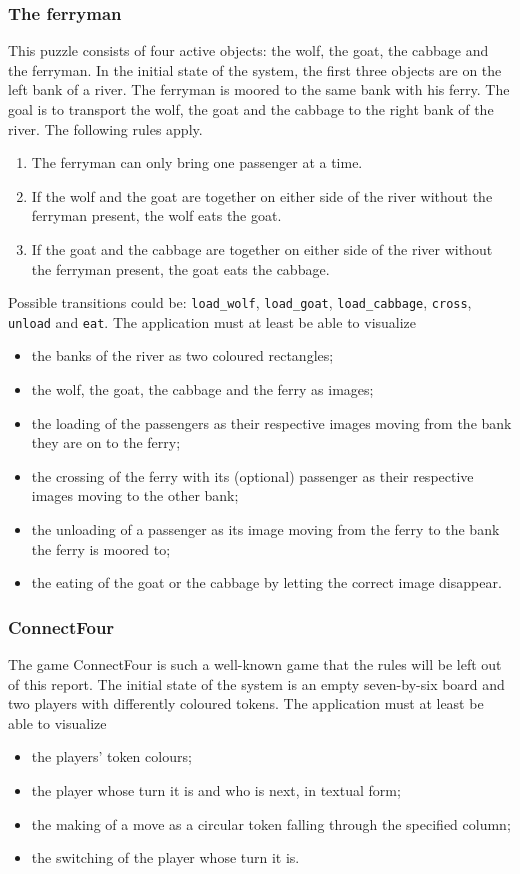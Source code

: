 \documentclass[a4paper]{article}
\begin{document}
\subsubsection{The ferryman}
This puzzle consists of four active objects: the wolf, the goat, the cabbage and the ferryman. In the initial state of the system, the first three objects are on the left bank of a river. The ferryman is moored to the same bank with his ferry. The goal is to transport the wolf, the goat and the cabbage to the right bank of the river. The following rules apply.
  \begin{enumerate}
  \item The ferryman can only bring one passenger at a time.
  \item If the wolf and the goat are together on either side of the river without the ferryman present, the wolf eats the goat.
  \item If the goat and the cabbage are together on either side of the river without the ferryman present, the goat eats the cabbage.
  \end{enumerate}
Possible transitions could be: \lstinline{load_wolf}, \lstinline{load_goat}, \lstinline{load_cabbage}, \lstinline{cross}, \lstinline{unload} and \lstinline{eat}. The application must at least be able to visualize 
  \begin{itemize}
  \item the banks of the river as two coloured rectangles;
  \item the wolf, the goat, the cabbage and the ferry as images;
  \item the loading of the passengers as their respective images moving from the bank they are on to the ferry;
  \item the crossing of the ferry with its (optional) passenger as their respective images moving to the other bank;
  \item the unloading of a passenger as its image moving from the ferry to the bank the ferry is moored to;
  \item the eating of the goat or the cabbage by letting the correct image disappear.
  \end{itemize}

\subsubsection{ConnectFour}
The game ConnectFour is such a well-known game that the rules will be left out of this report. The initial state of the system is an empty seven-by-six board and two players with differently coloured tokens. The application must at least be able to visualize
  \begin{itemize}
  \item the players' token colours; 
  \item the player whose turn it is and who is next, in textual form;
  \item the making of a move as a circular token falling through the specified column;
  \item the switching of the player whose turn it is.
  \end{itemize}
\end{document}
